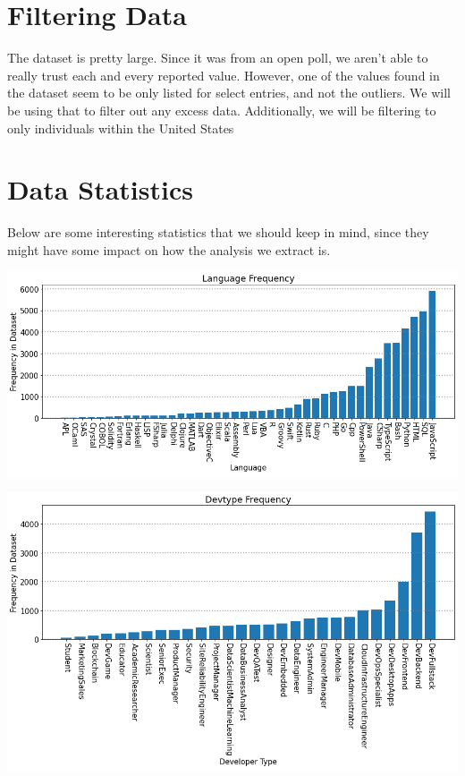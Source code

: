 \documentclass{report}
\begin{document}
\section{Filtering Data}

The dataset is pretty large. Since it was from an open poll, we aren't able to really trust each and every reported value. However, one of the values found in the dataset seem to be only listed for select entries, and not the outliers. We will be using that to filter out any excess data. Additionally, we will be filtering to only individuals within the United States

\section{Data Statistics}

Below are some interesting statistics that we should keep in mind, since they might have some impact on how the analysis we extract is.

\vspace{0.5in}

\includegraphics[width=0.9\linewidth]{frequencyLanguage.png}

\vspace{0.5in}

\includegraphics[width=0.9\linewidth]{frequencyDevtype.png}
\end{document}
